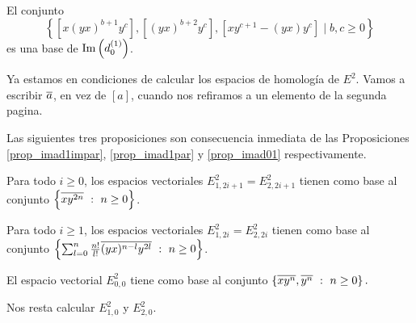 \documentclass[fleqn,../tesis.tex]{subfiles}
\begin{document}
\begin{prop} \label{prop_imad01}
    El conjunto
    \[
        \left\lbrace \left[x(yx)^{b + 1}y^c\right], \left[(yx)^{b + 2}y^c\right], \left[xy^{c + 1} - (yx)y^c\right] \mid b,c \geq 0 \right\rbrace    
    \]
    es una base de $\operatorname{Im}\left(d_0^{(1)}\right)$.
\end{prop}

Ya estamos en condiciones de calcular los espacios de homología de $E^{2}$. Vamos
a escribir $\overline{a}$, en vez de $\left[a\right]$, cuando nos refiramos a un elemento de la segunda pagina.

Las siguientes tres proposiciones son consecuencia inmediata de las Proposiciones \ref{prop_imad1impar}, \ref{prop_imad1par} y \ref{prop_imad01}
respectivamente.
\begin{prop} 
    Para todo $i \geq 0$, los espacios vectoriales $E_{1,2i + 1}^2 = E_{2, 2i + 1}^2$
	tienen como base al conjunto $\left\{ \overline{xy^{2n}} \ :\ n \geq 0\right\}$.
\end{prop}

\begin{prop}
    Para todo $i \geq 1$, los espacios vectoriales $E_{1,2i}^2 = E_{2, 2i}^2$
	tienen como base al conjunto $\left\{ \sum_{l = 0}^n \frac{n!}{l!}\overline{(yx)^{n - l}y^{2l}} \ :\ n \geq 0\right\}$.
\end{prop}

\begin{prop}
    El espacio vectorial $E^{2}_{0, 0}$ tiene como base al conjunto $\left\{ \overline{xy^{n}}, \overline{y^n} \ :\ n \geq 0\right\}.$
\end{prop}

Nos resta calcular $E^2_{1,0}$ y $E^2_{2, 0}$.
\end{document}
